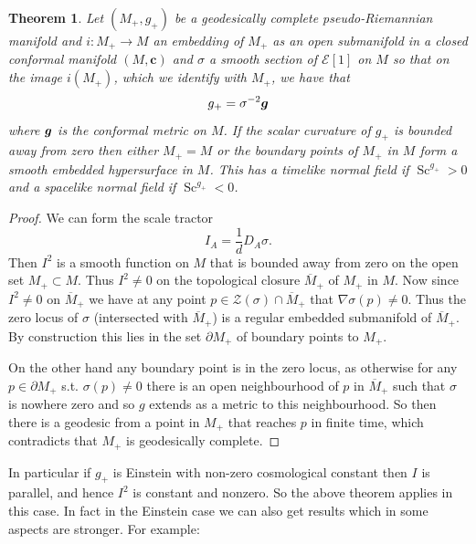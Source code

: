 \documentclass[a4paper,12pt]{amsart}
\def\g{g_+}
\def\M{M_+}
\newcommand{\cZ}{\mathcal{Z}}
\def\Cal{\mathcal}
\newcommand{\cc}{\boldsymbol{c}}
\newcommand{\ce}{{\Cal E}}
\def\bg{\mbox{\boldmath $g$}}
\newcommand{\si}{\sigma}
\newtheorem{theorem}{Theorem}[section]
\theoremstyle{remark}
\newcommand{\Sc}{\operatorname{Sc}}
\begin{document}
\begin{theorem}\label{newcpt} 
Let $(\M,\g)$ be a geodesically complete pseudo-Riemannian manifold and $i:\M\to M$ an embedding of $\M$ as an open submanifold in a closed conformal manifold $(M,\cc)$ and $\si$ a smooth section of $\ce[1]$ on $M$ so that on the image $i(\M)$, which we identify with $\M$, we have that
$$
\g = \si^{-2}\bg
$$ 
where $\bg$ is the conformal metric on $M$. If the scalar curvature
of $\g$ is bounded away from zero then either $\M=M$ or  the boundary points of $\M$ in $M$ form a smooth embedded hypersurface in $M$. This has a timelike normal field if $\Sc^{\g}>0$ and a spacelike normal field if $\Sc^{\g} <0$. 
\end{theorem}
\begin{proof}
We can form the scale tractor 
$$
I_A=\frac{1}{d}D_A \si. 
$$  
Then $I^2$ is a smooth function on $M$ that is bounded away from zero on the open set $\M \subset M$. Thus $I^2 \neq 0$ on the topological closure $\overline{M}_+$ of $\M$ in $M$.  Now since $I^2 \neq 0$ on $\overline{M}_+$ we have at any point $p\in \cZ(\si) \cap \overline{M}_+$ that $\nabla \si (p)\neq 0$. Thus the zero locus of $\si$ (intersected with $\overline{M}_+$) is a regular embedded submanifold of $\overline{M}_+$. By construction this lies in the set $\partial \M$ of boundary points to $\M$. 

On the other hand any boundary point is in the zero locus, as otherwise
for any $p\in \partial \M$ s.t. $\si(p)\neq 0$ there is an open
neighbourhood of $p$ in $\overline{M}_+$ such that $\si$ is nowhere zero
and so $g$ extends as a metric to this neighbourhood. So then there is a
geodesic from a point in $\M$ that reaches $p$ in finite time, which
contradicts that $\M$ is geodesically complete.
\end{proof}

In particular if $\g$ is Einstein with non-zero cosmological constant
then $I$ is parallel, and hence $I^2$ is constant and nonzero. So the above theorem applies in this case. In fact in the Einstein case we can also get results which in some aspects are stronger. For example:
\end{document}
